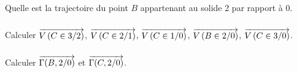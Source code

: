 \documentclass[10pt,oneside]{article}
\begin{document}
\subparagraph{}
Quelle est la trajectoire du point $B$ appartenant au solide 2 par rapport à 0.

\subparagraph{}
Calculer $\overrightarrow{V\left( {C} \in {3}/{2}\right)}$, $\overrightarrow{V\left( {C} \in {2}/{1}\right)}$, $\overrightarrow{V\left( {C} \in {1}/{0}\right)}$, $\overrightarrow{V\left( {B} \in {2}/{0}\right)}$, $\overrightarrow{V\left( {C} \in {3}/{0}\right)}$.

\subparagraph{}
Calculer $\overrightarrow{\Gamma(B,2/0)}$ et $\overrightarrow{\Gamma(C,2/0)}$.
\end{document}
